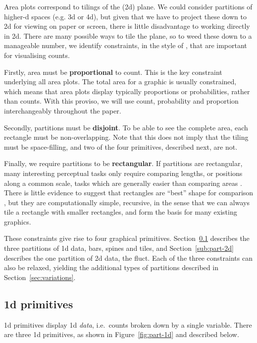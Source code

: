 \documentclass[journal]{vgtc}
\begin{document}
Area plots correspond to tilings of the (2d) plane. We could consider partitions of higher-d spaces (e.g. 3d or 4d), but given that we have to project these down to 2d for viewing on paper or screen, there is little disadvantage to working directly in 2d. There are many possible ways to tile the plane, so to weed these down to a manageable number, we identify  constraints, in the style of \citep{keim:2002}, that are important for visualising counts.

Firstly, area must be {\bf proportional} to count. This is the key constraint underlying all area plots. The total area for a graphic is usually constrained, which means that area plots display typically proportions or probabilities, rather than counts. With this proviso, we will use count, probability and proportion interchangeably throughout the paper.

Secondly, partitions must be {\bf disjoint}. To be able to see the complete area, each rectangle must be non-overlapping. Note that this does not imply that the tiling must be space-filling, and two of the four primitives, described next, are not.

Finally, we require partitions to be {\bf rectangular}. If partitions are rectangular, many interesting perceptual tasks only require comparing lengths, or positions along a common scale, tasks which are generally easier than comparing areas \citep{cleveland:1984,cleveland:1986}. There is little evidence to suggest that rectangles are ``best'' shape for comparison \citep{hollands:1998,simkin:1987}, but they are computationally simple, recursive, in the sense that we can always tile a rectangle with smaller rectangles, and form the basis for many existing graphics.

These constraints give rise to four graphical primitives. Section~\ref{sub:part-1d} describes the three partitions of 1d data, bars, spines and tiles, and Section~\ref{sub:part-2d} describes the one partition of 2d data, the fluct. Each of the three constraints can also be relaxed, yielding the additional types of partitions described in Section~\ref{sec:variations}.

\subsection{1d primitives}
\label{sub:part-1d}

1d primitives display 1d \emph{data}, i.e.\ counts broken down by a single variable. There are three 1d primitives, as shown in Figure~\ref{fig:part-1d} and described below.
\end{document}
